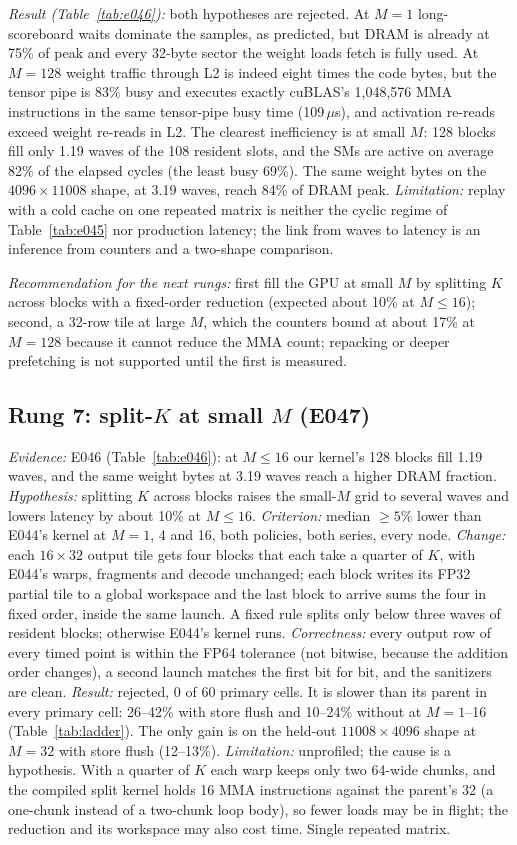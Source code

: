 \documentclass[sigconf,nonacm]{acmart}
\begin{document}
\emph{Result (Table~\ref{tab:e046}):} both hypotheses are rejected. At $M=1$ long-scoreboard waits dominate the samples, as predicted, but DRAM is already at 75\% of peak and every 32-byte sector the weight loads fetch is fully used. At $M=128$ weight traffic through L2 is indeed eight times the code bytes, but the tensor pipe is 83\% busy and executes exactly cuBLAS's 1,048,576 MMA instructions in the same tensor-pipe busy time (109\,$\mu$s), and activation re-reads exceed weight re-reads in L2. The clearest inefficiency is at small $M$: 128 blocks fill only 1.19 waves of the 108 resident slots, and the SMs are active on average 82\% of the elapsed cycles (the least busy 69\%). The same weight bytes on the $4096\times11008$ shape, at 3.19 waves, reach 84\% of DRAM peak. \emph{Limitation:} replay with a cold cache on one repeated matrix is neither the cyclic regime of Table~\ref{tab:e045} nor production latency; the link from waves to latency is an inference from counters and a two-shape comparison.

\emph{Recommendation for the next rungs:} first fill the GPU at small $M$ by splitting $K$ across blocks with a fixed-order reduction (expected about 10\% at $M \le 16$); second, a 32-row tile at large $M$, which the counters bound at about 17\% at $M=128$ because it cannot reduce the MMA count; repacking or deeper prefetching is not supported until the first is measured.

\subsection{Rung 7: split-$K$ at small $M$ (E047)}
\emph{Evidence:} E046 (Table~\ref{tab:e046}): at $M \le 16$ our kernel's 128 blocks fill 1.19 waves, and the same weight bytes at 3.19 waves reach a higher DRAM fraction. \emph{Hypothesis:} splitting $K$ across blocks raises the small-$M$ grid to several waves and lowers latency by about 10\% at $M \le 16$. \emph{Criterion:} median $\ge 5\%$ lower than E044's kernel at $M=1$, 4 and 16, both policies, both series, every node. \emph{Change:} each $16\times32$ output tile gets four blocks that each take a quarter of $K$, with E044's warps, fragments and decode unchanged; each block writes its FP32 partial tile to a global workspace and the last block to arrive sums the four in fixed order, inside the same launch. A fixed rule splits only below three waves of resident blocks; otherwise E044's kernel runs. \emph{Correctness:} every output row of every timed point is within the FP64 tolerance (not bitwise, because the addition order changes), a second launch matches the first bit for bit, and the sanitizers are clean. \emph{Result:} rejected, 0 of 60 primary cells. It is slower than its parent in every primary cell: 26--42\% with store flush and 10--24\% without at $M=1$--16 (Table~\ref{tab:ladder}). The only gain is on the held-out $11008\times4096$ shape at $M=32$ with store flush (12--13\%). \emph{Limitation:} unprofiled; the cause is a hypothesis. With a quarter of $K$ each warp keeps only two 64-wide chunks, and the compiled split kernel holds 16 MMA instructions against the parent's 32 (a one-chunk instead of a two-chunk loop body), so fewer loads may be in flight; the reduction and its workspace may also cost time. Single repeated matrix.
\end{document}
